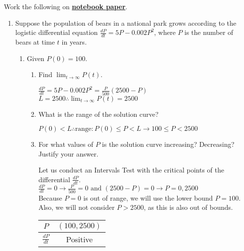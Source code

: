\documentclass[10pt,letterpaper]{report}
\begin{document}
Work the following on \textbf{\underline{notebook paper}}.
\begin{enumerate}
  \item{Suppose the population of bears in a national park grows according to the logistic differential equation $\frac{dP}{dt}=5P-0.002P^{2}$, where $P$ is the number of bears at time $t$ in years.}
  \begin{enumerate}
    \item{Given $P(0)=100$.}
    \begin{enumerate}
      \item{Find $\lim_{t\to\infty}P(t)$. \\}
      
        $\frac{dP}{dt}=5P-0.002P^{2}=\frac{P}{500}\left(2500-P\right)$ \\
        
        $L=2500\therefore \lim_{t\to\infty}P(t)=2500$ \\
        
      \item{What is the range of the solution curve? \\}
      
        $P(0)<L\therefore \text{range}: P(0)\leq P< L\rightarrow 100\leq P< 2500$ \\
        
      \item{For what values of $P$ is the solution curve increasing? Decreasing? Justify your answer. \\}
      
        Let us conduct an Intervals Test with the critical points of the differential $\frac{dP}{dt}$. \\
        
        $\frac{dP}{dt}=0\rightarrow \frac{P}{500}=0 \text{ and } \left(2500-P\right)=0\rightarrow P=0, 2500$ \\
        
        Because $P=0$ is out of range, we will use the lower bound $P=100$. Also, we will not consider $P>2500$, as this is also out of bounds. 
        
        \begin{center}
          \begin{tabular}{| c | c |}
            \hline
            $P$ & $(100, 2500)$ \\
            \hline
            $\frac{dP}{dt}$ & Positive \\
            \hline
          \end{tabular}
        \end{center} \\
        

\end{enumerate}
\end{enumerate}
\end{enumerate}
\end{document}
